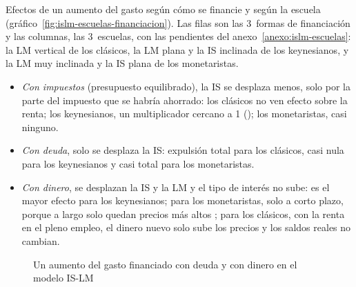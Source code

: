 \documentclass[11pt]{article}
\begin{document}
\begin{anotaciones}
Efectos de un aumento del gasto según cómo se financie y según la escuela (gráfico~\ref{fig:islm-escuelas-financiacion}). Las filas son las 3~formas de financiación y las columnas, las 3~escuelas, con las pendientes del anexo~\ref{anexo:islm-escuelas}: la LM vertical de los clásicos, la LM plana y la IS inclinada de los keynesianos, y la LM muy inclinada y la IS plana de los monetaristas.
\begin{itemize}
\item \emph{Con impuestos} (presupuesto equilibrado), la IS se desplaza menos, solo por la parte del impuesto que se habría ahorrado: los clásicos no ven efecto sobre la renta; los keynesianos, un multiplicador cercano a 1 (); los monetaristas, casi ninguno.
\item \emph{Con deuda}, solo se desplaza la IS: expulsión total para los clásicos, casi nula para los keynesianos y casi total para los monetaristas.
\item \emph{Con dinero}, se desplazan la IS y la LM y el tipo de interés no sube: es el mayor efecto para los keynesianos; para los monetaristas, solo a corto plazo, porque a largo solo quedan precios más altos ; para los clásicos, con la renta en el pleno empleo, el dinero nuevo solo sube los precios y los saldos reales no cambian.
\end{itemize}
\begin{figuracaja}
\caption{Una política fiscal expansiva con distintas formas de financiación, según las escuelas}\label{fig:islm-escuelas-financiacion}
\end{figuracaja}
\end{anotaciones}

\begin{figure}[H]
\centering
\caption{Un aumento del gasto financiado con deuda y con dinero en el modelo IS-LM}\label{fig:islm-financiacion}
\end{figure}
\end{document}
